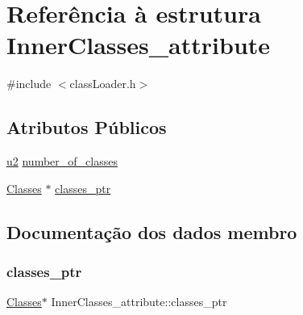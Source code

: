 \hypertarget{struct_inner_classes__attribute}{}\section{Referência à estrutura Inner\+Classes\+\_\+attribute}
\label{struct_inner_classes__attribute}


{\ttfamily \#include $<$class\+Loader.\+h$>$}

\subsection*{Atributos Públicos}
\begin{DoxyCompactItemize}
\item 
\hyperlink{util_8h_a55ef8d87fd202b8417704c089899c5b9}{u2} \hyperlink{struct_inner_classes__attribute_ae1ab3ffc94d37479a2f58cb801674191}{number\+\_\+of\+\_\+classes}
\item 
\hyperlink{struct_classes}{Classes} $\ast$ \hyperlink{struct_inner_classes__attribute_a960fe320e13e7858453240314615c6d0}{classes\+\_\+ptr}
\end{DoxyCompactItemize}


\subsection{Documentação dos dados membro}
\mbox{\label{struct_inner_classes__attribute_a960fe320e13e7858453240314615c6d0}} 
\subsubsection{\texorpdfstring{classes\+\_\+ptr}{classes\_ptr}}
{\footnotesize\ttfamily \hyperlink{struct_classes}{Classes}$\ast$ Inner\+Classes\+\_\+attribute\+::classes\+\_\+ptr}

\mbox{\label{struct_inner_classes__attribute_ae1ab3ffc94d37479a2f58cb801674191}} 
